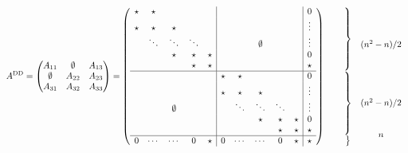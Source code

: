 \[
  A^{\mathrm{DD}}=
  \begin{pmatrix}
    A_{11}&\emptyset&A_{13}\\
    \emptyset&A_{22}&A_{23}\\
    A_{31}&A_{32}&A_{33}
  \end{pmatrix}=
\left(\begin{array}{ccccc|ccccc|c}
  \star&\star &      &      &      &&&&&&0\\
  \star&\star &\star &      &      &&&&&&\vdots\\
       &\ddots&\ddots&\ddots&      &&&\emptyset&&&\vdots\\
       &      &\star &\star &\star &&&&&&0\\
       &      &      &\star &\star &&&&&&\star\\ \hline
  &&&&&\star&\star &      &      &      &0\\
  &&&&&\star&\star &\star &      &      &\vdots\\
  &&\emptyset&&&     &\ddots&\ddots&\ddots&      &\vdots\\
  &&&&&     &      &\star &\star &\star &0\\
  &&&&&     &      &      &\star &\star &\star\\ \hline
  0&\cdots&\cdots&0&\star&0&\cdots&\cdots&0&\star&\star
\end{array}\right)
\begin{array}{c}
  \left.\begin{array}{c}
    \phantom{0}\\ \phantom{\vdots}\\ \phantom{\vdots}\\ \phantom{0}\\ 
    \phantom{\star}\\
  \end{array}\right\} \\
  \left.\begin{array}{c}
    \phantom{0}\\ \phantom{\vdots}\\ \phantom{\vdots}\\ \phantom{0}\\ 
    \phantom{\star}\\
  \end{array}\right\} \\
  \left.\begin{array}{c}
    \phantom{0}\\ 
  \end{array}\right\}
\end{array}
\begin{array}{c}
  \phantom{0}\\ \phantom{\vdots}\\ (n^2-n)/2\\ \phantom{0}\\ \phantom{\star}\\
  \phantom{0}\\ \phantom{\vdots}\\ (n^2-n)/2\\ \phantom{0}\\ \phantom{\star}\\
  n
\end{array}
\]
